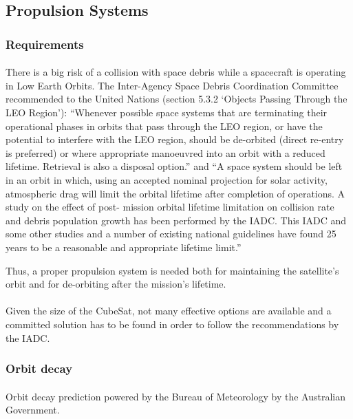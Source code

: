 \subsection{Propulsion Systems}

\subsubsection{Requirements}
\paragraph{}There is a big risk of a collision with space debris while a spacecraft is operating in Low Earth Orbits. The Inter-Agency Space Debris Coordination Committee recommended to the United Nations (section 5.3.2 ‘Objects Passing Through the LEO Region’): “Whenever possible space systems that are terminating their operational phases in orbits that pass through the LEO region, or have the potential to interfere with the LEO region, should be de-orbited (direct re-entry is preferred) or where appropriate manoeuvred into an orbit with a reduced lifetime. Retrieval is also a disposal option.” and “A space system should be left in an orbit in which, using an accepted nominal projection for solar activity, atmospheric drag will limit the orbital lifetime after completion of operations. A study on the effect of post- mission orbital lifetime limitation on collision rate and debris population growth has been performed by the IADC. This IADC and some other studies and a number of existing national guidelines have found 25 years to be a reasonable and appropriate lifetime limit.”

Thus, a proper propulsion system is needed both for maintaining the satellite's orbit and for de-orbiting after the mission's lifetime.

\paragraph{}Given the size of the CubeSat, not many effective options are available and a committed solution has to be found in order to follow the recommendations by the IADC.


\subsubsection{Orbit decay}


\paragraph{}Orbit decay prediction powered by the Bureau of Meteorology by the Australian Government.

